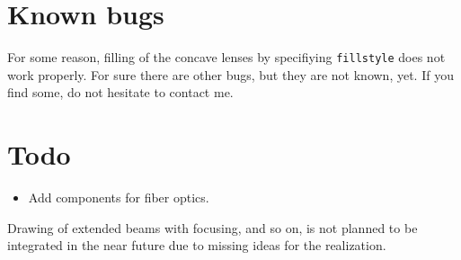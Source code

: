 \documentclass[headinclude,DIV12]{scrartcl}
\newcommand{\parameter}[1]{\texttt{#1}}
\begin{document}
\section{Known bugs}
 
For some reason, filling of the concave lenses by
specifiying \parameter{fillstyle} does not work properly. For sure there
are other bugs, but they are not known, yet. If you find some, do not
hesitate to contact me.

\section{ Todo}

\begin{itemize}
\item Add components for fiber optics.
\end{itemize}

Drawing of extended beams with focusing, and so on, is not planned to be
integrated in the near future due to missing ideas for the realization.
\end{document}
